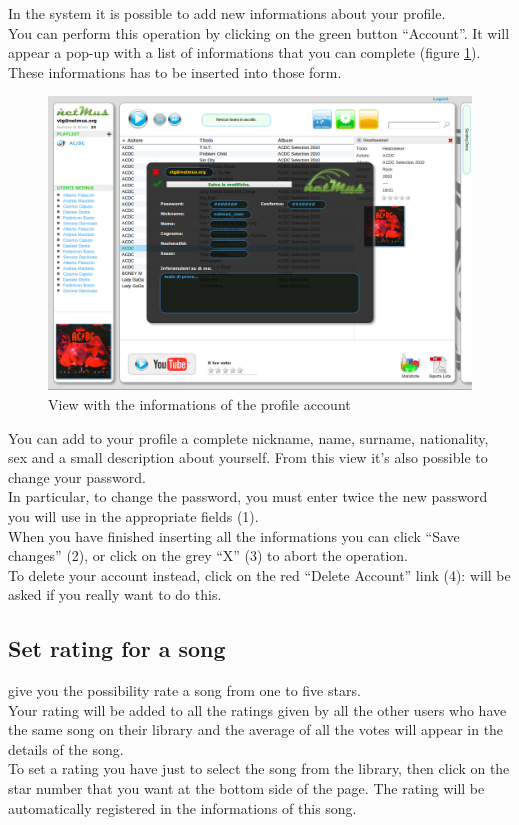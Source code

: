 In the  system it is possible to add new informations about your
profile.\\
You can perform this operation by clicking on the green button ``Account''. It
will appear a pop-up with a list of informations that you can complete (figure
\ref{fig:profilo}). These informations has to be inserted into those form.\\
\begin{figure}[!htbp]
  \centering
  \includegraphics[width=15cm]{img/MU/profile_view.png}
\caption{View with the informations of the profile account}
\label{fig:profilo}
\end{figure}

You can add to your profile a complete nickname, name, surname, nationality, sex
and a small description about yourself. From this view it's also possible to change
your password.\\

In particular, to change the password, you must enter twice the new
password you will use in the appropriate fields (1). \\

When you have finished inserting all the informations you can click ``Save
changes'' (2), or click on the grey ``X'' (3) to abort the operation.\\

To delete your account instead, click on the red ``Delete Account'' link (4):
will be asked if you really want to do this.

\subsection{Set rating for a song}
\label{cap:voto}
 give you the possibility rate a song from one to five
stars.\\
Your rating will be added to all the ratings given by all the other users who
have the same song on their library and the average of all the votes will appear
in the details of the song.\\
To set a rating you have just to select the song from the library, then click on
the star number that you want at the bottom side of the page. The rating will be
automatically registered in the informations of this song.

